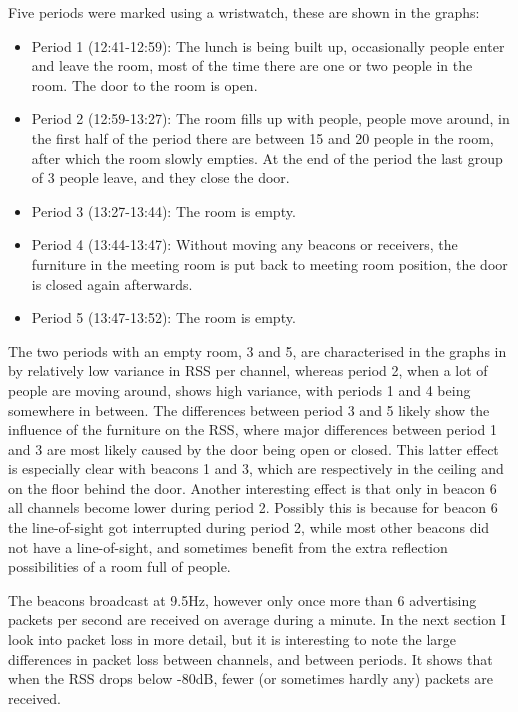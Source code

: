 Five periods were marked using a wristwatch, these are shown in the graphs:
\begin{itemize}
    \item Period 1 (12:41-12:59): The lunch is being built up, occasionally people enter and leave the room, most of the time there are one or two people in the room.
        The door to the room is open.
    \item Period 2 (12:59-13:27): The room fills up with people, people move around, in the first half of the period there are between 15 and 20 people in the room, after which the room slowly empties.
        At the end of the period the last group of 3 people leave, and they close the door.
    \item Period 3 (13:27-13:44): The room is empty.
    \item Period 4 (13:44-13:47): Without moving any beacons or receivers, the furniture in the meeting room is put back to meeting room position, the door is closed again afterwards.
    \item Period 5 (13:47-13:52): The room is empty.
\end{itemize}

The two periods with an empty room, 3 and 5, are characterised in the graphs in  by relatively low variance in RSS per channel, whereas period 2, when a lot of people are moving around, shows high variance, with periods 1 and 4 being somewhere in between.
The differences between period 3 and 5 likely show the influence of the furniture on the RSS, where major differences between period 1 and 3 are most likely caused by the door being open or closed.
This latter effect is especially clear with beacons 1 and 3, which are respectively in the ceiling and on the floor behind the door.
Another interesting effect is that only in beacon 6 all channels become lower during period 2.
Possibly this is because for beacon 6 the line-of-sight got interrupted during period 2, while most other beacons did not have a line-of-sight, and sometimes benefit from the extra reflection possibilities of a room full of people.

The beacons broadcast at 9.5Hz, however only once more than 6 advertising packets per second are received on average during a minute.
In the next section I look into packet loss in more detail, but it is interesting to note the large differences in packet loss between channels, and between periods.
It shows that when the RSS drops below -80dB, fewer (or sometimes hardly any) packets are received.

